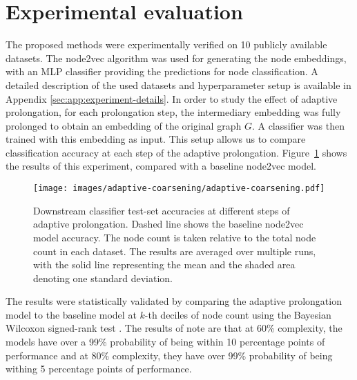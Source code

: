 \section{Experimental evaluation}\label{sec:experimental-evaluation}

The proposed methods were experimentally verified on 10 publicly available datasets. The node2vec algorithm was used for generating the node embeddings, with an MLP classifier providing the predictions for node classification. A detailed description of the used datasets and hyperparameter setup is available in Appendix \ref{sec:app:experiment-details}. In order to study the effect of adaptive prolongation, for each prolongation step, the intermediary embedding was fully prolonged to obtain an embedding of the original graph \( G \). A classifier was then trained with this embedding as input. This setup allows us to compare classification accuracy at each step of the adaptive prolongation. Figure~\ref{fig:adaptive-coarsening} shows the results of this experiment, compared with a baseline node2vec model.

\begin{figure}
  \centering
  \texttt{[image: images/adaptive-coarsening/adaptive-coarsening.pdf]}
  \caption{Downstream classifier test-set accuracies at different steps of adaptive prolongation. Dashed line shows the baseline node2vec model accuracy. The node count is taken relative to the total node count in each dataset. The results are averaged over multiple runs, with the solid line representing the mean and the shaded area denoting one standard deviation.}
  \label{fig:adaptive-coarsening}
\end{figure}

The results were statistically validated by comparing the adaptive prolongation model to the baseline model at \( k \)-th deciles of node count using the Bayesian Wilcoxon signed-rank test \cite{benavoli_bayesian_2014}. The results of note are that at 60\% complexity, the models have over a 99\% probability of being within 10 percentage points of performance and at 80\% complexity, they have over 99\% probability of being withing 5 percentage points of performance.
